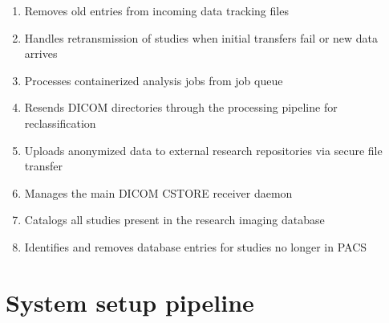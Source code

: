 \documentclass[letterpaper,10pt,english]{sphinxmanual}
\begin{document}
\begin{enumerate}
\item {} 
\sphinxAtStartPar
{\hyperref[\detokenize{Architecture/scripts/removeOldEntries::doc}]{}} \sphinxhyphen{} Removes old entries from incoming data tracking files

\item {} 
\sphinxAtStartPar
{\hyperref[\detokenize{Architecture/scripts/resendProject::doc}]{}} \sphinxhyphen{} Handles re\sphinxhyphen{}transmission of studies when initial transfers fail or new data arrives

\item {} 
\sphinxAtStartPar
{\hyperref[\detokenize{Architecture/scripts/runOneJob::doc}]{}} \sphinxhyphen{} Processes containerized analysis jobs from job queue

\item {} 
\sphinxAtStartPar
{\hyperref[\detokenize{Architecture/scripts/s2m::doc}]{}} \sphinxhyphen{} Re\sphinxhyphen{}sends DICOM directories through the processing pipeline for re\sphinxhyphen{}classification

\item {} 
\sphinxAtStartPar
{\hyperref[\detokenize{Architecture/scripts/sendFiles::doc}]{}} \sphinxhyphen{} Uploads anonymized data to external research repositories via secure file transfer

\item {} 
\sphinxAtStartPar
{\hyperref[\detokenize{Architecture/scripts/storectl::doc}]{}} \sphinxhyphen{} Manages the main DICOM C\sphinxhyphen{}STORE receiver daemon

\item {} 
\sphinxAtStartPar
{\hyperref[\detokenize{Architecture/scripts/whatIsInIDS7::doc}]{}}\sphinxhyphen{} Catalogs all studies present in the research imaging database

\item {} 
\sphinxAtStartPar
{\hyperref[\detokenize{Architecture/scripts/whatIsNotInIDS7::doc}]{}}\sphinxhyphen{} Identifies and removes database entries for studies no longer in PACS

\end{enumerate}


\section{System setup pipeline}
\label{\detokenize{Architecture/index:system-setup-pipeline}}
\end{document}
